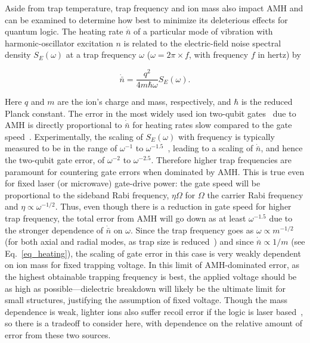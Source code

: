 \documentclass[%
reprint,
 amsmath,amssymb,
]{revtex4-1}
\begin{document}
Aside from trap temperature, trap frequency and ion mass also impact AMH and can be examined to determine how best to minimize its deleterious effects for quantum logic.  The heating rate $\dot{\bar{n}}$ of a particular mode of vibration with harmonic-oscillator excitation $n$ is related to the electric-field noise spectral density $S_{E}(\omega)$ at a trap frequency $\omega$ ($\omega=2\pi\times f$, with frequency $f$ in hertz) by

\begin{equation}
\dot{\bar{n}}=\frac{q^2}{4 m \hbar \omega}S_{E}(\omega).
\label{eq_heating}
\end{equation}

\noindent Here $q$ and $m$ are the ion's charge and mass, respectively, and $\hbar$ is the reduced Planck constant.  The error in the most widely used ion two-qubit gates~\cite{PhysRevA.62.022311_2000,LeibfriedDidiGate2003} due to AMH is directly proportional to $\dot{\bar{n}}$ for heating rates slow compared to the gate speed~\cite{Ballance2QubitHyperfineGate2016}.  Experimentally, the scaling of $S_{E}(\omega)$ with frequency is typically measured to be in the range of $\omega^{-1}$ to $\omega^{-1.5}$~\cite{PhysRevLett.109.103001_2012,PhysRevB.89.245435_2014,PhysRevLett.120.023201,PhysRevA.97.020302_2018}, leading to a scaling of $\dot{\bar{n}}$, and hence the two-qubit gate error, of $\omega^{-2}$ to $\omega^{-2.5}$.  Therefore higher trap frequencies are paramount for countering gate errors when dominated by AMH.  This is true even for fixed laser (or microwave) gate-drive power:  the gate speed will be proportional to the sideband Rabi frequency, $\eta \Omega$ for $\Omega$ the carrier Rabi frequency and $\eta\propto\omega^{-1/2}$. Thus, even though there is a reduction in gate speed for higher trap frequency, the total error from AMH will go down as at least $\omega^{-1.5}$ due to the stronger dependence of $\dot{\bar{n}}$ on $\omega$.  Since the trap frequency goes as $\omega\propto m^{-1/2}$ (for both axial and radial modes, as trap size is reduced~\cite{NIST:SET:QIC:05}) and since $\dot{\bar{n}}\propto1/m$ (see Eq.~\ref{eq_heating}), the scaling of gate error in this case is very weakly dependent on ion mass for fixed trapping voltage.  In this limit of AMH-dominated error, as the highest obtainable trapping frequency is best, the applied voltage should be as high as possible---dielectric breakdown will likely be the ultimate limit for small structures, justifying the assumption of fixed voltage.  Though the mass dependence is weak, lighter ions also suffer recoil error if the logic is laser based~\cite{PhysRevA.75.042329_2007}, so there is a tradeoff to consider here, with dependence on the relative amount of error from these two sources.
\end{document}
